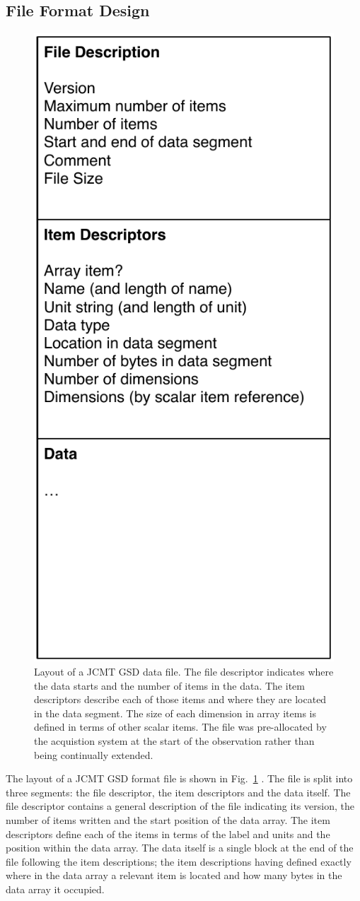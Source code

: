 \documentclass[final,authoryear,5p,times,twocolumn]{elsarticle}
\begin{document}
\subsection{File Format Design}

\begin{figure}
\begin{center}
\includegraphics[width=0.5\columnwidth]{gsd-file-layout}
\end{center}
\caption{Layout of a JCMT GSD data file. The file descriptor indicates
where the data starts and the number of items in the data. The item
descriptors describe each of those items and where they are located in
the data segment. The size of each dimension in array items is defined
in terms of other scalar items. The file was pre-allocated by the
acquistion system at the start of the observation rather than being
continually extended.}
\label{fig:jcmtgsd}
\end{figure}

The layout of a JCMT GSD format file is shown in
Fig.~\ref{fig:jcmtgsd} \citep[see also][]{mtdn84}. The file is split
into three segments: the file descriptor, the item descriptors and the
data itself. The file descriptor contains a general description of the
file indicating its version, the number of items written and the start
position of the data array. The item descriptors define each of the
items in terms of the label and units and the position within the data
array. The data itself is a single block at the end of the file
following the item descriptions; the item descriptions having defined
exactly where in the data array a relevant item is located and how
many bytes in the data array it occupied.
\end{document}
